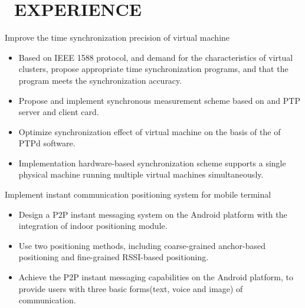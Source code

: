 \documentclass{resume}
\begin{document}
\section{\faUsers\ EXPERIENCE}
\setlength{\parindent}{2em}Improve the time synchronization precision of virtual machine
\begin{onehalfspacing}
\begin{itemize}[leftmargin=5em]
  \item Based on IEEE 1588 protocol, and demand for the characteristics of virtual clusters, propose appropriate time synchronization programs, and that the program meets the synchronization accuracy.
  \item Propose and implement synchronous measurement scheme based on and PTP server and client card.
  \item Optimize synchronization effect of virtual machine on the basis of the of PTPd software.
  \item Implementation hardware-based synchronization scheme supports a single physical machine running multiple virtual machines simultaneously.
\end{itemize}
\end{onehalfspacing}

\setlength{\parindent}{2em}Implement instant communication positioning system for mobile terminal
\begin{onehalfspacing}
\begin{itemize}[leftmargin=5em]
  \item Design a P2P instant messaging system on the Android platform with the integration of indoor positioning module.
  \item Use two positioning methods, including coarse-grained anchor-based positioning and fine-grained RSSI-based positioning.
  \item Achieve the P2P instant messaging capabilities on the Android platform, to provide users with three basic forms(text, voice and image) of communication. 
\end{itemize}
\end{onehalfspacing}

\end{document}
